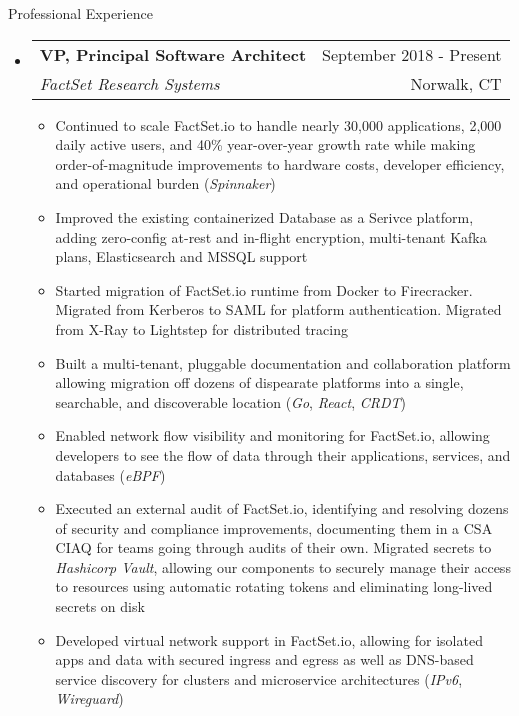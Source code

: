 \documentclass[letterpaper,10pt]{article}
\makeatletter
\newenvironment{ressection}[1]{
	\vspace{4pt}
	{\fontfamily{phv}\selectfont\Large#1}
	\begin{itemize}
	\vspace{3pt}
}{
	\end{itemize}
}
\newcommand{\ressubitem}[1]{
	\vspace{-1pt}
	\item \begin{flushleft} #1 \end{flushleft}
}
\newcommand{\resbigitem}[4]{
	\vspace{-5pt}
	\item
	\begin{tabular*}{6in}{l@{\extracolsep{\fill}}r}
		\textbf{#1} & #2 \\
		\textit{#3} & #4\\
	\end{tabular*}
}
\newenvironment{ressubsec}[4]{
	\resbigitem{#1}{#2}{#3}{#4}
	\vspace{-2pt}
	\begin{itemize}
}{
	\end{itemize}
}
\makeatother
\begin{document}
\begin{ressection}{Professional Experience}
\begin{ressubsec}{VP, Principal Software Architect}{September 2018 - Present}{FactSet Research Systems}{Norwalk, CT}
		\ressubitem{Continued to scale FactSet.io to handle nearly 30,000 applications, 2,000 daily active users, and 40\% year-over-year growth rate while making order-of-magnitude improvements to hardware costs, developer efficiency, and operational burden (\textit{Spinnaker})}
		\ressubitem{Improved the existing containerized Database as a Serivce platform, adding zero-config at-rest and in-flight encryption, multi-tenant Kafka plans, Elasticsearch and MSSQL support}
		\ressubitem{Started migration of FactSet.io runtime from Docker to Firecracker.  Migrated from Kerberos to SAML for platform authentication.  Migrated from X-Ray to Lightstep for distributed tracing}
		\ressubitem{Built a multi-tenant, pluggable documentation and collaboration platform allowing migration off dozens of dispearate platforms into a single, searchable, and discoverable location (\textit{Go}, \textit{React}, \textit{CRDT})}
		\ressubitem{Enabled network flow visibility and monitoring for FactSet.io, allowing developers to see the flow of data through their applications, services, and databases (\textit{eBPF})}
		\ressubitem{Executed an external audit of FactSet.io, identifying and resolving dozens of security and compliance improvements, documenting them in a CSA CIAQ for teams going through audits of their own.  Migrated secrets to \textit{Hashicorp Vault}, allowing our components to securely manage their access to resources using automatic rotating tokens and eliminating long-lived secrets on disk}
		\ressubitem{Developed virtual network support in FactSet.io, allowing for isolated apps and data with secured ingress and egress as well as DNS-based service discovery for clusters and microservice architectures (\textit{IPv6}, \textit{Wireguard})}
	\end{ressubsec}

\pagebreak


\end{ressection}
\end{document}
